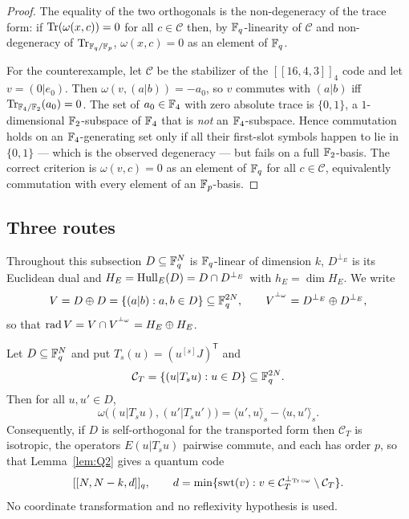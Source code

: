 \begin{proof}
The equality of the two orthogonals is the non-degeneracy of the trace form: if
$\operatorname{Tr}(\omega(x,c))=0$ for all $c\in\mathcal C$ then, by $\mathbb F_q$-linearity of
$\mathcal C$ and non-degeneracy of $\operatorname{Tr}_{\mathbb F_q/\mathbb F_p}$, $\omega(x,c)=0$ as an
element of $\mathbb F_q$.

For the counterexample, let $\mathcal C$ be the stabilizer of the
$[[16,4,3]]_4$ code and let $v=(0|e_0)$. Then
$\omega(v,(a|b))=-a_0$, so $v$ commutes with $(a|b)$ iff
$\operatorname{Tr}_{\mathbb F_4/\mathbb F_2}(a_0)=0$. The set of $a_0\in\mathbb F_4$ with zero absolute trace is
$\{0,1\}$, a $1$-dimensional $\mathbb F_2$-subspace of $\mathbb F_4$ that is \emph{not} an
$\mathbb F_4$-subspace. Hence commutation holds on an $\mathbb F_4$-generating set only if
all their first-slot symbols happen to lie in $\{0,1\}$ --- which is the
observed degeneracy --- but fails on a full $\mathbb F_2$-basis. The correct criterion
is $\omega(v,c)=0$ as an element of $\mathbb F_q$ for all $c\in\mathcal C$,
equivalently commutation with every element of an $\mathbb F_p$-basis.
\end{proof}

\subsection{Three routes}

Throughout this subsection $D\subseteq\mathbb F_q^{N}$ is $\mathbb F_q$-linear of
dimension $k$, $D^{\perp_E}$ is its Euclidean dual and
$H_E=\operatorname{Hull}_E(D)=D\cap D^{\perp_E}$ with $h_E=\dim H_E$. We write
\begin{equation}\label{eq:V}
  V=D\oplus D=\{(a|b):a,b\in D\}\subseteq\mathbb F_q^{2N},
  \qquad
  V^{{}^{\perp_\omega}}=D^{\perp_E}\oplus D^{\perp_E},
\end{equation}
so that $\operatorname{rad} V=V\cap V^{{}^{\perp_\omega}}=H_E\oplus H_E$.

\begin{theorem}
\label{thm:R1}
Let $D\subseteq\mathbb F_q^{N}$ and put $T_s(u)=(u^{[s]}J)^{\mathsf T}$ and
\[
  \mathcal C_T=\{(u|T_su):u\in D\}\subseteq\mathbb F_q^{2N}.
\]
Then for all $u,u'\in D$,
\[
  \omega\bigl((u|T_su),(u'|T_su')\bigr)
  =\langle u',u\rangle^{\widehat{}}_s-\langle u,u'\rangle^{\widehat{}}_s .
\]
Consequently, if $D$ is self-orthogonal for the transported form then
$\mathcal C_T$ is isotropic, the operators $E(u|T_su)$ pairwise commute, and
each has order $p$, so that Lemma~\ref{lem:Q2} gives a quantum code
\[
  [[N,N-k,d]]_q,\qquad
  d=\min\{\operatorname{swt}(v):v\in\mathcal C_T^{\perp_{\operatorname{Tr}\circ\omega}}\setminus
  \mathcal C_T\}.
\]
No coordinate transformation and no reflexivity hypothesis is used.
\end{theorem}

